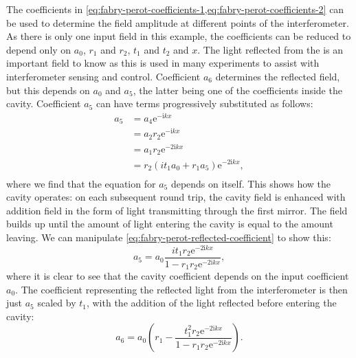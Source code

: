 The coefficients in \cref{eq:fabry-perot-coefficients-1,eq:fabry-perot-coefficients-2} can be used to determine the field amplitude at different points of the interferometer. As there is only one input field in this example, the coefficients can be reduced to depend only on $a_0$, $r_1$ and $r_2$, $t_1$ and $t_2$ and $x$. The light reflected from the \FP{} is an important field to know as this is used in many experiments to assist with interferometer sensing and control. Coefficient $a_6$ determines the reflected field, but this depends on $a_0$ and $a_5$, the latter being one of the coefficients inside the cavity. Coefficient $a_5$ can have terms progressively substituted as follows:
\begin{equation}
  \label{eq:fabry-perot-reflected-coefficient}
  \begin{split}
    a_5 &= a_4 \text{e}^{-\text{i} kx} \\
        &= a_2 r_2 \text{e}^{-\text{i} kx} \\
        &= a_1 r_2 \text{e}^{-2\text{i} kx} \\
        &= r_2 \left( it_1 a_0 + r_1 a_5 \right) \text{e}^{-2\text{i} kx}, \\
  \end{split}
\end{equation}
where we find that the equation for $a_5$ depends on itself. This shows how the cavity operates: on each subsequent round trip, the cavity field is enhanced with addition field in the form of light transmitting through the first mirror. The field builds up until the amount of light entering the cavity is equal to the amount leaving. We can manipulate \cref{eq:fabry-perot-reflected-coefficient} to show this:
\begin{equation}
  a_5 = a_0 \frac{it_1 r_2 \text{e}^{-2\text{i}kx}}{1 - r_1 r_2 \text{e}^{-2\text{i}kx}},
\end{equation}
where it is clear to see that the cavity coefficient depends on the input coefficient $a_0$. The coefficient representing the reflected light from the interferometer is then just $a_5$ scaled by $t_1$, with the addition of the light reflected before entering the cavity:
\begin{equation}
  a_6 = a_0 \left( r_1 - \frac{t_1^2 r_2 \text{e}^{-2\text{i}kx}}{1 - r_1 r_2 \text{e}^{-2\text{i}kx}} \right).
\end{equation}

